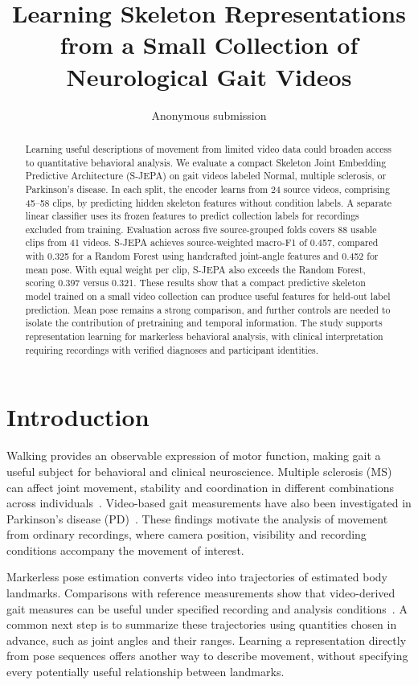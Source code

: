 \documentclass[10pt,twocolumn,letterpaper]{article}
\title{Learning Skeleton Representations\\from a Small Collection of Neurological Gait Videos}
\author{Anonymous submission}
\begin{document}
\maketitle
\begin{abstract}
Learning useful descriptions of movement from limited video data could broaden access to quantitative behavioral analysis. We evaluate a compact Skeleton Joint Embedding Predictive Architecture (S-JEPA) on gait videos labeled Normal, multiple sclerosis, or Parkinson's disease. In each split, the encoder learns from 24 source videos, comprising 45--58 clips, by predicting hidden skeleton features without condition labels. A separate linear classifier uses its frozen features to predict collection labels for recordings excluded from training. Evaluation across five source-grouped folds covers 88 usable clips from 41 videos. S-JEPA achieves source-weighted macro-F1 of 0.457, compared with 0.325 for a Random Forest using handcrafted joint-angle features and 0.452 for mean pose. With equal weight per clip, S-JEPA also exceeds the Random Forest, scoring 0.397 versus 0.321. These results show that a compact predictive skeleton model trained on a small video collection can produce useful features for held-out label prediction. Mean pose remains a strong comparison, and further controls are needed to isolate the contribution of pretraining and temporal information. The study supports representation learning for markerless behavioral analysis, with clinical interpretation requiring recordings with verified diagnoses and participant identities.
\end{abstract}


\section{Introduction}
Walking provides an observable expression of motor function, making gait a useful subject for behavioral and clinical neuroscience. Multiple sclerosis (MS) can affect joint movement, stability and coordination in different combinations across individuals~\cite{filli2018,plotnik2020}. Video-based gait measurements have also been investigated in Parkinson's disease (PD)~\cite{shin2021}. These findings motivate the analysis of movement from ordinary recordings, where camera position, visibility and recording conditions accompany the movement of interest.

Markerless pose estimation converts video into trajectories of estimated body landmarks. Comparisons with reference measurements show that video-derived gait measures can be useful under specified recording and analysis conditions~\cite{stenum2021,stenum2024}. A common next step is to summarize these trajectories using quantities chosen in advance, such as joint angles and their ranges. Learning a representation directly from pose sequences offers another way to describe movement, without specifying every potentially useful relationship between landmarks.
\end{document}
